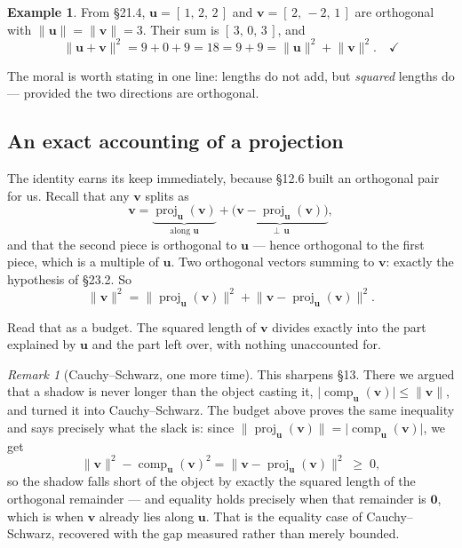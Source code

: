\documentclass[11pt]{article}
\theoremstyle{definition}
\newtheorem{ex}{Example}[section]
\theoremstyle{remark}
\newtheorem*{rmk}{Remark}
\newcommand{\vc}[1]{\mathbf{#1}}
\newcommand{\norm}[1]{\lVert #1\rVert}
\newcommand{\proj}[2]{\operatorname{proj}_{#1}(#2)}
\newcommand{\comp}[2]{\operatorname{comp}_{#1}(#2)}
\begin{document}
\begin{ex}
From \S21.4, $\vc{u}=[\,1,\,2,\,2\,]$ and $\vc{v}=[\,2,\,-2,\,1\,]$ are
orthogonal with $\norm{\vc{u}}=\norm{\vc{v}}=3$. Their sum is
$[\,3,\,0,\,3\,]$, and
\[
  \norm{\vc{u}+\vc{v}}^{2} = 9+0+9 = 18 = 9 + 9
  = \norm{\vc{u}}^{2}+\norm{\vc{v}}^{2} . \quad\checkmark
\]
\end{ex}

\noindent The moral is worth stating in one line: lengths do not add, but
\emph{squared} lengths do --- provided the two directions are orthogonal.

\subsection{An exact accounting of a projection}
The identity earns its keep immediately, because \S12.6 built an orthogonal pair
for us. Recall that any $\vc{v}$ splits as
\[
  \vc{v} = \underbrace{\proj{\vc{u}}{\vc{v}}}_{\text{along }\vc{u}}
         + \underbrace{\bigl(\vc{v}-\proj{\vc{u}}{\vc{v}}\bigr)}_{\perp\,\vc{u}} ,
\]
and that the second piece is orthogonal to $\vc{u}$ --- hence orthogonal to the
first piece, which is a multiple of $\vc{u}$. Two orthogonal vectors summing to
$\vc{v}$: exactly the hypothesis of \S23.2. So
\[
  \norm{\vc{v}}^{2}
  = \norm{\proj{\vc{u}}{\vc{v}}}^{2}
    + \norm{\vc{v}-\proj{\vc{u}}{\vc{v}}}^{2} .
\]

\noindent Read that as a budget. The squared length of $\vc{v}$ divides exactly
into the part explained by $\vc{u}$ and the part left over, with nothing
unaccounted for.

\begin{rmk}[Cauchy--Schwarz, one more time]
This sharpens \S13. There we argued that a shadow is never longer than the
object casting it, $\lvert\comp{\vc{u}}{\vc{v}}\rvert\le\norm{\vc{v}}$, and
turned it into Cauchy--Schwarz. The budget above proves the same inequality and
says precisely what the slack is: since
$\norm{\proj{\vc{u}}{\vc{v}}}=\lvert\comp{\vc{u}}{\vc{v}}\rvert$, we get
\[
  \norm{\vc{v}}^{2} - \comp{\vc{u}}{\vc{v}}^{2}
  = \norm{\vc{v}-\proj{\vc{u}}{\vc{v}}}^{2} \;\ge\; 0 ,
\]
so the shadow falls short of the object by exactly the squared length of the
orthogonal remainder --- and equality holds precisely when that remainder is
$\vc{0}$, which is when $\vc{v}$ already lies along $\vc{u}$. That is the
equality case of Cauchy--Schwarz, recovered with the gap measured rather than
merely bounded.
\end{rmk}
\end{document}
